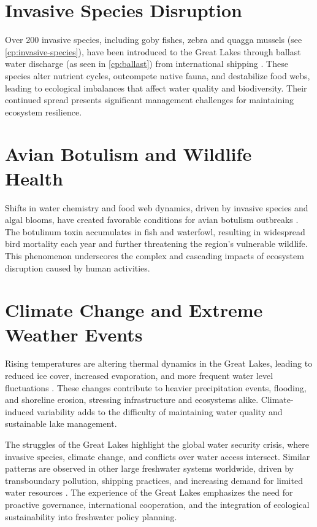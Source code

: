 \section{Invasive Species Disruption}
Over 200 invasive species, including goby fishes, zebra and quagga mussels (see \autoref{cp:invasive-species}), have been introduced to the Great Lakes through ballast water discharge (as seen in \autoref{cp:ballast}) from international shipping \autocite{bongiorno2025invasion}. These species alter nutrient cycles, outcompete native fauna, and destabilize food webs, leading to ecological imbalances that affect water quality and biodiversity. Their continued spread presents significant management challenges for maintaining ecosystem resilience.


\section{Avian Botulism and Wildlife Health}
Shifts in water chemistry and food web dynamics, driven by invasive species and algal blooms, have created favorable conditions for avian botulism outbreaks \autocite{bongiorno2025invasion}. The botulinum toxin accumulates in fish and waterfowl, resulting in widespread bird mortality each year and further threatening the region’s vulnerable wildlife. This phenomenon underscores the complex and cascading impacts of ecosystem disruption caused by human activities.

\section{Climate Change and Extreme Weather Events}
Rising temperatures are altering thermal dynamics in the Great Lakes, leading to reduced ice cover, increased evaporation, and more frequent water level fluctuations \autocite{mishra2011thermal}. These changes contribute to heavier precipitation events, flooding, and shoreline erosion, stressing infrastructure and ecosystems alike. Climate-induced variability adds to the difficulty of maintaining water quality and sustainable lake management.

The struggles of the Great Lakes highlight the global water security crisis, where invasive species, climate change, and conflicts over water access intersect. Similar patterns are observed
in other large freshwater systems worldwide, driven by transboundary pollution, shipping practices, and increasing demand for limited water resources \autocite{un2021progress}. The experience of the Great Lakes emphasizes the need for proactive governance, international cooperation, and the integration of ecological sustainability into freshwater policy planning.
